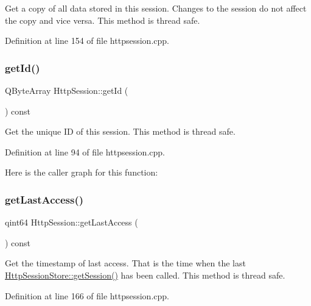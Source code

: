 Get a copy of all data stored in this session. Changes to the session do not affect the copy and vice versa. This method is thread safe. 

Definition at line 154 of file httpsession.\+cpp.

\mbox{\label{classstefanfrings_1_1_http_session_a40a020b5fa0350f28fd40891642c967e}} 
\subsubsection{\texorpdfstring{get\+Id()}{getId()}}
{\footnotesize\ttfamily Q\+Byte\+Array Http\+Session\+::get\+Id (\begin{DoxyParamCaption}{ }\end{DoxyParamCaption}) const}

Get the unique ID of this session. This method is thread safe. 

Definition at line 94 of file httpsession.\+cpp.

Here is the caller graph for this function\+:
\mbox{\label{classstefanfrings_1_1_http_session_ab6cc679fbcfe56aceea35b4efaacf967}} 
\subsubsection{\texorpdfstring{get\+Last\+Access()}{getLastAccess()}}
{\footnotesize\ttfamily qint64 Http\+Session\+::get\+Last\+Access (\begin{DoxyParamCaption}{ }\end{DoxyParamCaption}) const}

Get the timestamp of last access. That is the time when the last \mbox{\hyperlink{classstefanfrings_1_1_http_session_store_aeaf8409e1844366c12f18fd34d477a31}{Http\+Session\+Store\+::get\+Session()}} has been called. This method is thread safe. 

Definition at line 166 of file httpsession.\+cpp.

\mbox{\label{classstefanfrings_1_1_http_session_a195963a20805ad00e0eacd90c0194d84}} 
